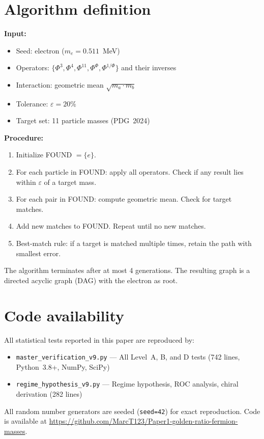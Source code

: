 \documentclass[11pt,a4paper]{article}
\begin{document}
\appendix

\section{Algorithm definition}
\label{app:algorithm}

\textbf{Input:}
\begin{itemize}
  \item Seed: electron ($m_e = 0.511$~MeV)
  \item Operators: $\{\Phi^3, \Phi^4, \Phi^{11}, \Phi^\Phi,
    \Phi^{1/\Phi}\}$ and their inverses
  \item Interaction: geometric mean $\sqrt{m_a \cdot m_b}$
  \item Tolerance: $\varepsilon = 20\%$
  \item Target set: 11 particle masses (PDG~2024)
\end{itemize}

\textbf{Procedure:}
\begin{enumerate}
  \item Initialize FOUND $= \{e\}$.
  \item For each particle in FOUND: apply all operators. Check if any
        result lies within $\varepsilon$ of a target mass.
  \item For each pair in FOUND: compute geometric mean. Check for
        target matches.
  \item Add new matches to FOUND. Repeat until no new matches.
  \item Best-match rule: if a target is matched multiple times, retain
        the path with smallest error.
\end{enumerate}

The algorithm terminates after at most 4 generations. The resulting
graph is a directed acyclic graph (DAG) with the electron as root.

\section{Code availability}
\label{app:code}

All statistical tests reported in this paper are reproduced by:
\begin{itemize}
  \item \texttt{master\_verification\_v9.py} --- All Level~A, B, and D
        tests (742 lines, Python~3.8+, NumPy, SciPy)
  \item \texttt{regime\_hypothesis\_v9.py} --- Regime hypothesis, ROC
        analysis, chiral derivation (282 lines)
\end{itemize}
All random number generators are seeded (\texttt{seed=42}) for exact
reproduction. Code is available at
\url{https://github.com/MarcT123/Paper1-golden-ratio-fermion-masses}.
\end{document}
